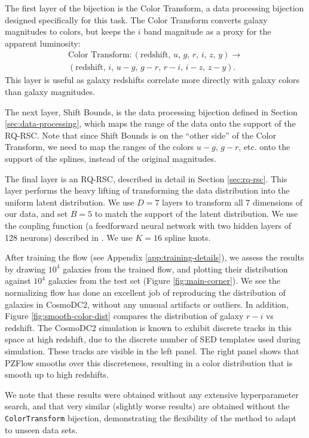 \documentclass[twocolumn,twocolappendix,linenumbers]{aastex631}
\begin{document}
The first layer of the bijection is the Color Transform, a data processing bijection designed specifically for this task.
The Color Transform converts galaxy magnitudes to colors, but keeps the $i$ band magnitude as a proxy for the apparent luminosity:
\begin{multline}
    \text{Color Transform} : (\text{redshift},\, u,\, g,\, r,\, i,\, z,\, y) \to \\
    (\text{redshift},\, i,\, u-g,\, g-r,\, r-i,\, i-z,\, z-y).
\end{multline}
This layer is useful as galaxy redshifts correlate more directly with galaxy colors than galaxy magnitudes.

The next layer, Shift Bounds, is the data processing bijection defined in Section \ref{sec:data-processing}, which maps the range of the data onto the support of the RQ-RSC.
Note that since Shift Bounds is on the ``other side'' of the Color Transform, we need to map the ranges of the colors $u-g$, $g-r$, etc. onto the support of the splines, instead of the original magnitudes.

The final layer is an RQ-RSC, described in detail in Section \ref{sec:rq-rsc}.
This layer performs the heavy lifting of transforming the data distribution into the uniform latent distribution.
We use $D=7$ layers to transform all 7 dimensions of our data, and set $B=5$ to match the support of the latent distribution.
We use the coupling function (a feedforward neural network with two hidden layers of 128 neurons) described in \citet{durkan2019}.
We use $K=16$ spline knots.

After training the flow (see Appendix \ref{app:training-details}), we assess the results by drawing $10^4$ galaxies from the trained flow, and plotting their distribution against  $10^4$ galaxies from the test set (Figure \ref{fig:main-corner}).
We see the normalizing flow has done an excellent job of reproducing the distribution of galaxies in CosmoDC2, without any unusual artifacts or outliers.
In addition, Figure \ref{fig:smooth-color-dist} compares the distribution of galaxy $r-i$ vs redshift.
The CosmoDC2 simulation is known to exhibit discrete tracks in this space at high redshift, due to the discrete number of SED templates used during simulation.
These tracks are visible in the left panel.
The right panel shows that PZFlow smooths over this discreteness, resulting in a color distribution that is smooth up to high redshifts.

We note that these results were obtained without any extensive hyperparameter search, and that very similar (slightly worse results) are obtained without the \texttt{ColorTransform} bijection, demonstrating the flexibility of the method to adapt to unseen data sets.
\end{document}
